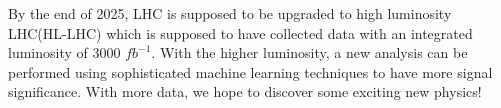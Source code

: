 By the end of 2025, LHC is supposed to be upgraded to high luminosity LHC(HL-LHC) which is supposed to have collected data with an integrated luminosity of 3000 $fb^{-1}$. With the higher luminosity, a new analysis can be performed using sophisticated machine learning techniques to have more signal significance. With more data, we hope to discover some exciting new physics!
\setcounter{equation}{0}
\setcounter{table}{0}
\setcounter{figure}{0}


    




